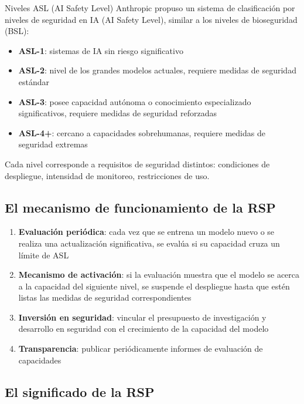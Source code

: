 \documentclass[a4paper]{article}
\begin{document}
\begin{importantbox}{Niveles ASL (AI Safety Level)}
Anthropic propuso un sistema de clasificación por niveles de seguridad en IA (AI Safety Level), similar a los niveles de bioseguridad (BSL):
\begin{itemize}
    \item \textbf{ASL-1}: sistemas de IA sin riesgo significativo
    \item \textbf{ASL-2}: nivel de los grandes modelos actuales, requiere medidas de seguridad estándar
    \item \textbf{ASL-3}: posee capacidad autónoma o conocimiento especializado significativos, requiere medidas de seguridad reforzadas
    \item \textbf{ASL-4+}: cercano a capacidades sobrehumanas, requiere medidas de seguridad extremas
\end{itemize}
Cada nivel corresponde a requisitos de seguridad distintos: condiciones de despliegue, intensidad de monitoreo, restricciones de uso.
\end{importantbox}

\subsection{El mecanismo de funcionamiento de la RSP}

\begin{enumerate}
    \item \textbf{Evaluación periódica}: cada vez que se entrena un modelo nuevo o se realiza una actualización significativa, se evalúa si su capacidad cruza un límite de ASL
    \item \textbf{Mecanismo de activación}: si la evaluación muestra que el modelo se acerca a la capacidad del siguiente nivel, se suspende el despliegue hasta que estén listas las medidas de seguridad correspondientes
    \item \textbf{Inversión en seguridad}: vincular el presupuesto de investigación y desarrollo en seguridad con el crecimiento de la capacidad del modelo
    \item \textbf{Transparencia}: publicar periódicamente informes de evaluación de capacidades
\end{enumerate}

\subsection{El significado de la RSP}
\end{document}
